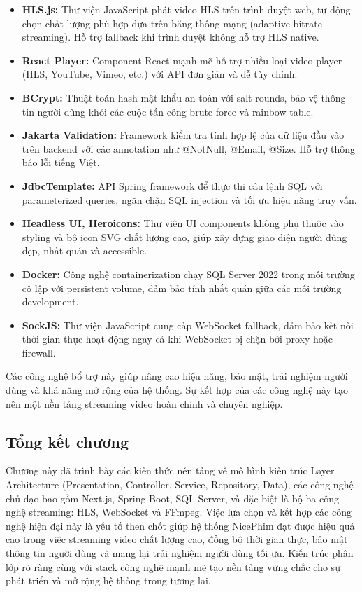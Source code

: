 \begin{itemize}
	\item \textbf{HLS.js:} Thư viện JavaScript phát video HLS trên trình duyệt web, tự động chọn chất lượng phù hợp dựa trên băng thông mạng (adaptive bitrate streaming). Hỗ trợ fallback khi trình duyệt không hỗ trợ HLS native.

	\item \textbf{React Player:} Component React mạnh mẽ hỗ trợ nhiều loại video player (HLS, YouTube, Vimeo, etc.) với API đơn giản và dễ tùy chỉnh.

	\item \textbf{BCrypt:} Thuật toán hash mật khẩu an toàn với salt rounds, bảo vệ thông tin người dùng khỏi các cuộc tấn công brute-force và rainbow table.

	\item \textbf{Jakarta Validation:} Framework kiểm tra tính hợp lệ của dữ liệu đầu vào trên backend với các annotation như @NotNull, @Email, @Size. Hỗ trợ thông báo lỗi tiếng Việt.

	\item \textbf{JdbcTemplate:} API Spring framework để thực thi câu lệnh SQL với parameterized queries, ngăn chặn SQL injection và tối ưu hiệu năng truy vấn.

	\item \textbf{Headless UI, Heroicons:} Thư viện UI components không phụ thuộc vào styling và bộ icon SVG chất lượng cao, giúp xây dựng giao diện người dùng đẹp, nhất quán và accessible.

	\item \textbf{Docker:} Công nghệ containerization chạy SQL Server 2022 trong môi trường cô lập với persistent volume, đảm bảo tính nhất quán giữa các môi trường development.

	\item \textbf{SockJS:} Thư viện JavaScript cung cấp WebSocket fallback, đảm bảo kết nối thời gian thực hoạt động ngay cả khi WebSocket bị chặn bởi proxy hoặc firewall.
\end{itemize}

Các công nghệ bổ trợ này giúp nâng cao hiệu năng, bảo mật, trải nghiệm người dùng và khả năng mở rộng của hệ thống. Sự kết hợp của các công nghệ này tạo nên một nền tảng streaming video hoàn chỉnh và chuyên nghiệp.

\subsection{Tổng kết chương}

Chương này đã trình bày các kiến thức nền tảng về mô hình kiến trúc Layer Architecture (Presentation, Controller, Service, Repository, Data), các công nghệ chủ đạo bao gồm Next.js, Spring Boot, SQL Server, và đặc biệt là bộ ba công nghệ streaming: HLS, WebSocket và FFmpeg. Việc lựa chọn và kết hợp các công nghệ hiện đại này là yếu tố then chốt giúp hệ thống NicePhim đạt được hiệu quả cao trong việc streaming video chất lượng cao, đồng bộ thời gian thực, bảo mật thông tin người dùng và mang lại trải nghiệm người dùng tối ưu. Kiến trúc phân lớp rõ ràng cùng với stack công nghệ mạnh mẽ tạo nền tảng vững chắc cho sự phát triển và mở rộng hệ thống trong tương lai.
